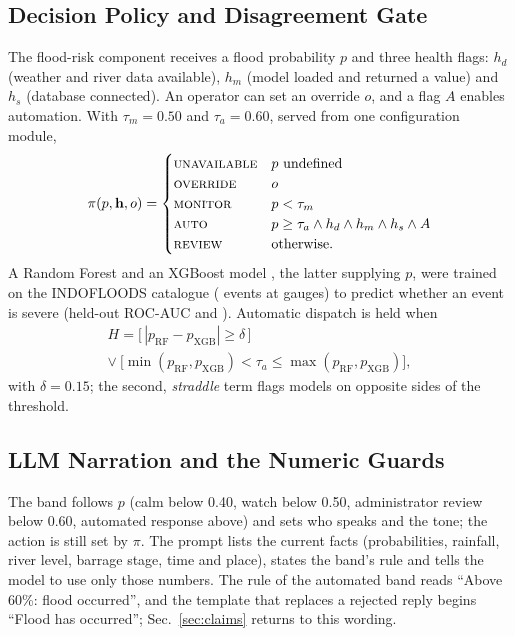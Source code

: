 \documentclass[conference]{IEEEtran}
\begin{document}
\subsection{Decision Policy and Disagreement Gate}
The flood-risk component receives a flood probability $p$ and three health flags: $h_d$ (weather and river data available), $h_m$ (model loaded and returned a value) and $h_s$ (database connected). An operator can set an override $o$, and a flag $A$ enables automation. With $\tau_m=0.50$ and $\tau_a=0.60$, served from one configuration module,
\begin{equation}
\pi(p,\mathbf{h},o)=
\begin{cases}
\textsc{unavailable} & p \text{ undefined}\\
\textsc{override} & o\\
\textsc{monitor} & p<\tau_m\\
\textsc{auto} & p\ge\tau_a \wedge h_d\wedge h_m\wedge h_s\wedge A\\
\textsc{review} & \text{otherwise.}
\end{cases}
\label{eq:policy}
\end{equation}
A Random Forest \cite{Breiman2001} and an XGBoost model \cite{Chen2016}, the latter supplying $p$, were trained on the INDOFLOODS catalogue (\ClsEvents{} events at \ClsGauges{} gauges) to predict whether an event is severe (held-out ROC-AUC \ClsAucRf{} and \ClsAucXgb). Automatic dispatch is held when
\begin{multline}
H=\big[\,|p_{\mathrm{RF}}-p_{\mathrm{XGB}}|\ge\delta\,\big]\\
\vee\ \big[\min(p_{\mathrm{RF}},p_{\mathrm{XGB}})<\tau_a\le\max(p_{\mathrm{RF}},p_{\mathrm{XGB}})\big],
\label{eq:dual}
\end{multline}
with $\delta=0.15$; the second, \emph{straddle} term flags models on opposite sides of the threshold.

\subsection{LLM Narration and the Numeric Guards}
\label{sec:guards}
The band follows $p$ (calm below 0.40, watch below 0.50, administrator review below 0.60, automated response above) and sets who speaks and the tone; the action is still set by $\pi$. The prompt lists the current facts (probabilities, rainfall, river level, barrage stage, time and place), states the band's rule and tells the model to use only those numbers. The rule of the automated band reads ``Above 60\%: flood occurred'', and the template that replaces a rejected reply begins ``Flood has occurred''; Sec.~\ref{sec:claims} returns to this wording.
\end{document}
